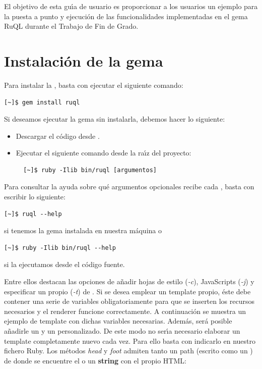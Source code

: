 El objetivo de esta gu\'{\i}a de usuario es proporcionar a los usuarios un ejemplo para la puesta a punto y ejecuci\'on de las 
funcionalidades implementadas en el gema RuQL durante el Trabajo de Fin de Grado.

\section{Instalaci\'on de la gema}
\label{Apendice2:instalacion}

Para instalar la , basta con ejecutar el siguiente comando:
\begin{verbatim}
[~]$ gem install ruql
\end{verbatim}

Si deseamos ejecutar la gema sin instalarla, debemos hacer lo siguiente:
\begin{itemize}
  \item Descargar el c\'odigo desde .
  \item Ejecutar el siguiente comando desde la ra\'{\i}z del proyecto:
  \begin{verbatim}
  [~]$ ruby -Ilib bin/ruql [argumentos]
  \end{verbatim}
\end{itemize}


Para consultar la ayuda sobre qu\'e argumentos opcionales recibe cada , basta con escribir lo siguiente:
\begin{verbatim}
[~]$ ruql --help
\end{verbatim}
si tenemos la gema instalada en nuestra m\'aquina o
\begin{verbatim}
[~]$ ruby -Ilib bin/ruql --help
\end{verbatim}
si la ejecutamos desde el c\'odigo fuente.
\bigskip

Entre ellos destacan las opciones de a\~{n}adir hojas de estilo (\textit{-c}), JavaScripts (\textit{-j}) y especificar un propio  (\textit{-t}) de \ceis{\ref{apend1:erb}}.
Si se desea emplear un template propio, \'este debe contener una serie de variables obligatoriamente para que se inserten los recursos necesarios y el renderer funcione
correctamente. A continuaci\'on se muestra un ejemplo de template con dichas variables necesarias. Adem\'as, ser\'a posible a\~{n}adirle un  y un  personalizado. 
De este modo no ser\'{\i}a necesario elaborar un template completamente nuevo cada vez. Para ello basta con indicarlo en nuestro fichero Ruby. Los m\'etodos \textit{head} y
\textit{foot} admiten tanto un path (escrito como un ) de donde se encuentre el   o un {\bfseries string} con el propio HTML:

